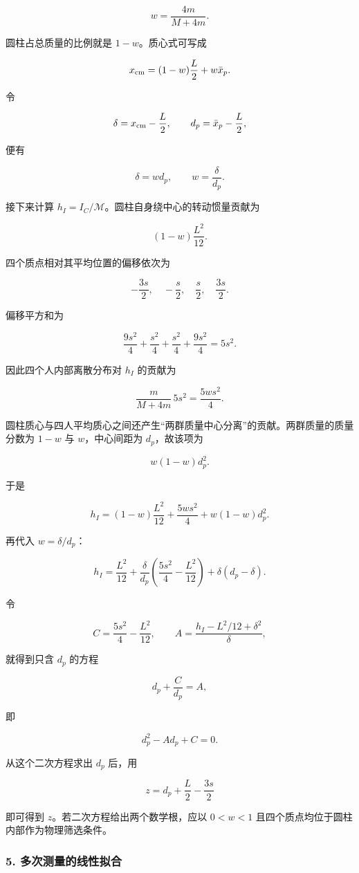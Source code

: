 \documentclass[12pt,a4paper,UTF8]{ctexart}
\begin{document}
\[
w=\frac{4m}{M+4m}.
\]

圆柱占总质量的比例就是 \(1-w\)。质心式可写成

\[
x_{\rm cm}=(1-w)\frac{L}{2}+w\bar x_p.
\]

令

\[
\delta=x_{\rm cm}-\frac{L}{2},
\qquad
d_p=\bar x_p-\frac{L}{2},
\]

便有

\[
\delta=wd_p,
\qquad
w=\frac{\delta}{d_p}.
\]

接下来计算 \(h_I=I_C/\mathcal M\)。圆柱自身绕中心的转动惯量贡献为

\[
(1-w)\frac{L^2}{12}.
\]

四个质点相对其平均位置的偏移依次为

\[
-\frac{3s}{2},\quad-\frac{s}{2},\quad
\frac{s}{2},\quad\frac{3s}{2}.
\]

偏移平方和为

\[
\frac{9s^2}{4}+\frac{s^2}{4}+\frac{s^2}{4}+\frac{9s^2}{4}=5s^2.
\]

因此四个人内部离散分布对 \(h_I\) 的贡献为

\[
\frac{m}{M+4m}\,5s^2=\frac{5ws^2}{4}.
\]

圆柱质心与四人平均质心之间还产生``两群质量中心分离''的贡献。两群质量的质量分数为
\(1-w\) 与 \(w\)，中心间距为 \(d_p\)，故该项为

\[
w(1-w)d_p^2.
\]

于是

\[
h_I=(1-w)\frac{L^2}{12}+\frac{5ws^2}{4}+w(1-w)d_p^2.
\]

再代入 \(w=\delta/d_p\)：

\[
h_I=\frac{L^2}{12}
+\frac{\delta}{d_p}\left(\frac{5s^2}{4}-\frac{L^2}{12}\right)
+\delta(d_p-\delta).
\]

令

\[
C=\frac{5s^2}{4}-\frac{L^2}{12},
\qquad
A=\frac{h_I-L^2/12+\delta^2}{\delta},
\]

就得到只含 \(d_p\) 的方程

\[
d_p+\frac{C}{d_p}=A,
\]

即

\[
d_p^2-Ad_p+C=0.
\]

从这个二次方程求出 \(d_p\) 后，用

\[
z=d_p+\frac{L}{2}-\frac{3s}{2}
\]

即可得到 \(z\)。若二次方程给出两个数学根，应以 \(0<w<1\)
且四个质点均位于圆柱内部作为物理筛选条件。

\subsubsection{5.
多次测量的线性拟合}\label{ux591aux6b21ux6d4bux91cfux7684ux7ebfux6027ux62dfux5408}
\end{document}
